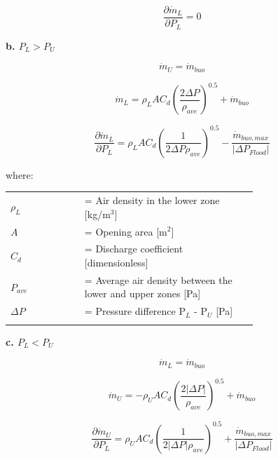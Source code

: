 \begin{equation}
\frac{\partial \dot{m}_L}{\partial P_L} = 0
\end{equation}

\textbf{b. $P_L > P_U$}

\begin{equation}
\dot{m}_U = \dot{m}_{buo}
\end{equation}

\begin{equation}
\dot{m}_L = \rho_L A C_d \left( \frac{2 \Delta P}{\rho_{ave}} \right)^{0.5} + \dot{m}_{buo}
\end{equation}

\begin{equation}
\frac{\partial \dot{m}_L}{\partial P_L} = \rho_L A C_d \left( \frac{1}{2\Delta P \rho_{ave}} \right )^{0.5} - \frac{\dot{m}_{buo,max}}{|\Delta P_{Flood}|}
\end{equation}

where:

\begin{tabular}{lp{0.7\linewidth}}
\\
$\rho_L$ &= Air density in the lower zone [kg/m\(^{3}\)]\\
$A$ &= Opening area [m\(^{2}\)]\\
$C_d$ &= Discharge coefficient [dimensionless]\\
$Ρ_{ave}$ &= Average air density between the lower and upper zones [Pa]\\
$\Delta P$ &= Pressure difference P\(_{L}\) - P\(_{U}\) [Pa]\\
\\
\end{tabular}

\textbf{c.  $P_L < P_U$}

\begin{equation}
\dot{m}_L = \dot{m}_{buo}
\end{equation}

\begin{equation}
\dot{m}_U =  - \rho_U A C_d \left( \frac{2\left| \Delta P \right|}{\rho_{ave}} \right)^{0.5} + \dot{m}_{buo}
\end{equation}

\begin{equation}
\frac{\partial \dot{m}_U}{\partial P_L} = \rho_U A C_d \left( \frac{1}{2 \left| \Delta P \right| \rho_{ave}} \right)^{0.5} + \frac{\dot{m}_{buo,max}}{\left| \Delta P_{Flood} \right|}
\end{equation}

